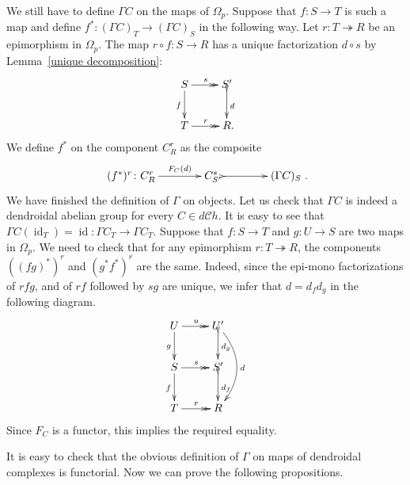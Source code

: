 \documentclass[a4paper]{amsart}
\theoremstyle{plain}
\theoremstyle{definition}
\theoremstyle{remark}
\DeclareMathOperator{\id}{id}
\newcommand{\rpd}{\Omega_p}
\newcommand{\To}{\longrightarrow}
\newcommand{\dCh}{d\mathcal{C}h}
\numberwithin{equation}{section}
\numberwithin{figure}{section}
\begin{document}
We still have to define $\Gamma C$ on the maps of $\rpd$. Suppose that $f\colon S\To T$ is such a map and define $f^*\colon(\Gamma C)_T\To (\Gamma C)_S$ in the following way. Let $r\colon T\twoheadrightarrow R$ be an epimorphism in $\rpd$. The map $r\circ f\colon S\To R$ has a unique factorization $d\circ s$ by Lemma~\ref{unique decomposition}:
\[
    \xymatrix{S\ar@{>>}[r]^s\ar[d]_f &S'\ar@{>->}[d]^d\\
        T\ar@{>>}[r]^r & R{\rlap .}}
\]
We define $f^*$ on the component $C_R^r$ as the composite
\[
    \xymatrix@C+5mm{(f^*)^r\colon C_R^r\ar[r]^-{F_C(d)} &C_{S'}^s\ar@{>->}[r] &(\Gamma C)_S}.
\]
We have finished the definition of $\Gamma$ on objects. Let us check that $\Gamma C$ is indeed a dendroidal abelian group for every $C\in \dCh$. It is easy to see that $\Gamma C(\id_T)=\id\colon \Gamma C_T\To \Gamma C_T$. Suppose that $f\colon S\To T$ and $g\colon U\To S$ are two maps in $\rpd$. We need to check that for any epimorphism $r\colon T\twoheadrightarrow R$, the components $((fg)^*)^r$ and $(g^*f^*)^r$ are the same. Indeed, since the epi-mono factorizations of $rfg$, and of $rf$ followed by $sg$ are unique, we infer that $d=d_fd_g$ in the following diagram.
\[
    \xymatrix{U\ar[d]_g\ar@{>>}[r]^u &U'\ar@/^6mm/[dd]^d\ar@{>->}[d]^{d_g}\\
    S\ar[d]_f\ar@{>>}[r]^s&S'\ar@{>->}[d]^{d_f}\\
    T\ar@{>>}[r]^r &R}
\]
Since $F_C$ is a functor, this implies the required equality.

It is easy to check that the obvious definition of $\Gamma$ on maps of dendroidal complexes is functorial. Now we can prove the following propositions.
\end{document}

